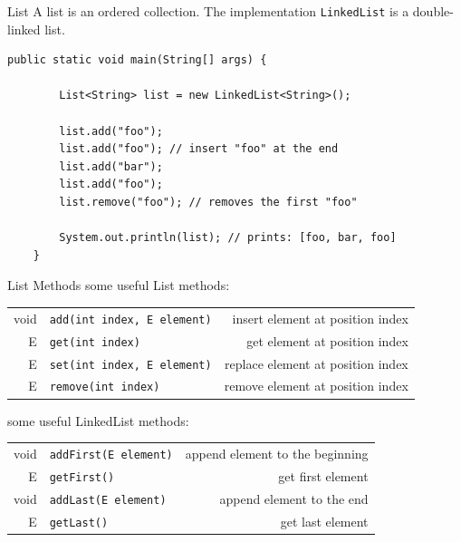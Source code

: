 \begin{frame}[fragile]{List}
	A list is an ordered collection.
	\vfill
	The implementation \texttt{LinkedList} is a double-linked list.
	\begin{lstlisting}[basicstyle=\ttfamily\scriptsize]
	public static void main(String[] args) {
	
	    List<String> list = new LinkedList<String>();
	    
	    list.add("foo"); 
	    list.add("foo"); // insert "foo" at the end
	    list.add("bar");
	    list.add("foo");
	    list.remove("foo"); // removes the first "foo"
	    
	    System.out.println(list); // prints: [foo, bar, foo]
	}
	\end{lstlisting}
\end{frame}
	
\begin{frame}[fragile]{List Methods}
	some useful List methods:\\
	\vspace{1em}
	\begin{tabular}{ r l r }
		void & \texttt{add(int index, E element)}
		& \footnotesize{insert element at position index} \\
		E &\texttt{get(int index)}
		& \footnotesize{get element at position index} \\
		E &\texttt{set(int index, E element)}
		& \footnotesize{replace element at position index} \\
		E &\texttt{remove(int index)}
		& \footnotesize{remove element at position index}
	\end{tabular}
	\vfill
	some useful LinkedList methods:\\
	\vspace{1em}
	\begin{tabular}{ r l r }
		void & \texttt{addFirst(E element)}
		& \footnotesize{append element to the beginning} \\
		E & \texttt{getFirst()}
		& \footnotesize{get first element} \\
		void & \texttt{addLast(E element)}
		& \footnotesize{append element to the end} \\
		E & \texttt{getLast()}
		& \footnotesize{get last element}
	\end{tabular}
\end{frame}

